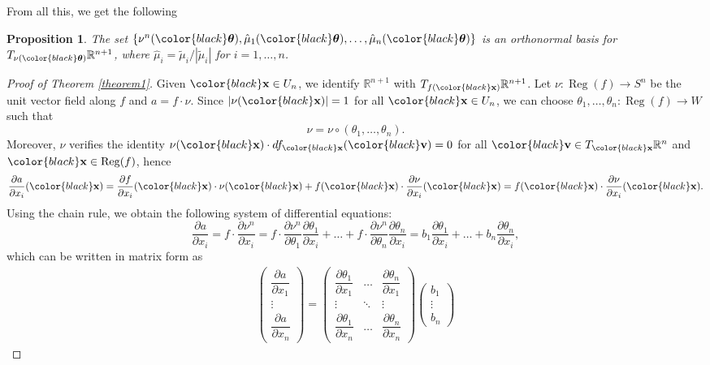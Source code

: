 \documentclass{amsart}
\newtheorem{proposition}{Proposition}
\theoremstyle{definition}
\theoremstyle{definition}
\theoremstyle{definition}
\newcommand{\mb}{\mathbb}
\DeclareMathOperator{\Reg}{Reg}
\begin{document}
From all this, we get the following

\begin{proposition}\label{nu mu orthonormal basis}
	The set $\{\nu^n({\color{black}\boldsymbol{\theta}}),
	\hat\mu_1({\color{black}\boldsymbol{\theta}}),
	\dots,\hat\mu_n({\color{black}\boldsymbol{\theta}})\}$ 
	is an orthonormal basis for $T_{\nu({\color{black}\boldsymbol{\theta}})}
	\mathbb{R}^{n+1}$, where $\hat\mu_i=\tilde\mu_i/|\tilde\mu_i|$ for $i=1,\dots,n$.
\end{proposition}

\begin{proof}[Proof of Theorem \ref{theorem1}]
	Given ${\color{black}\bf x} \in U_n$, 
	we identify $\mb{R}^{n+1}$ with $T_{f({\color{black}\bf x})}
	\mb{R}^{n+1}$.
	Let $\nu\colon \Reg(f) \to S^n$ be the unit vector field along $f$ and $a=f\cdot \nu$.	
	Since $|\nu({\color{black}\bf x})|=1$ 
	for all ${\color{black}\bf x} \in U_n$, we can choose $\theta_1,\dots,\theta_n\colon \Reg(f) \to W$ such that
		\[\nu=\nu\circ (\theta_1,\dots,\theta_n).\]
	Moreover, $\nu$ verifies the identity $\nu({\color{black}\bf x})
	\cdot df_{\color{black}\bf x}({\color{black}\bf v})=0$ 
	for all ${\color{black}\bf v} \in T_{\color{black}\bf x}\mb{R}^n$ and 
	${\color{black}\bf x} \in \Reg(f)$, hence
		\[\frac{\partial a}{\partial x_i}({\color{black}\bf x})
		=\frac{\partial f}{\partial x_i}({\color{black}\bf x})
		\cdot \nu({\color{black}\bf x})+f({\color{black}\bf x})
		\cdot \frac{\partial \nu}{\partial x_i}({\color{black}\bf x})
		=f({\color{black}\bf x})\cdot 
		\frac{\partial \nu}{\partial x_i}({\color{black}\bf x}).\]
	Using the chain rule, we obtain the following system of differential equations:
	\[
		\frac{\partial a}{\partial x_i}=f\cdot \frac{\partial \nu^n}{\partial x_i}
		=f\cdot \frac{\partial \nu^n}{\partial \theta_1}\frac{\partial \theta_1}{\partial x_i}+\dots+f\cdot 	\frac{\partial \nu^n}{\partial \theta_n}\frac{\partial \theta_n}{\partial x_i}=b_1\frac{\partial \theta_1}{\partial x_i}+\dots+b_n\frac{\partial \theta_n}{\partial x_i},
	\]
	which can be written in matrix form as
	\begin{align}\label{system b1 bn}
		\begin{pmatrix}
			\dfrac{\partial a}{\partial x_1} \\ \vdots \\ \dfrac{\partial a}{\partial x_n}	
		\end{pmatrix}
		=
		\begin{pmatrix}
			\dfrac{\partial \theta_1}{\partial x_1} & \hdots & \dfrac{\partial \theta_n}{\partial x_1}	\\
			\vdots				& \ddots & \vdots				\\
			\dfrac{\partial \theta_1}{\partial x_n} & \hdots & \dfrac{\partial \theta_n}{\partial x_n}
		\end{pmatrix}
		\begin{pmatrix}
			b_1 \\ \vdots \\ b_n
		\end{pmatrix}
	\end{align}


\end{proof}
\end{document}
